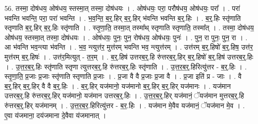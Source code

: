 \documentclass[17pt]{extarticle}
\begin{document}
56. तस्मा॒ दोष॑धय॒ ओष॑धय॒ स्तस्मा॒त् तस्मा॒ दोष॑धयः । . ओष॑धयः॒ परा॒ परौष॑धय॒ ओष॑धयः॒ परा᳚ । . परा॑ भवन्ति भवन्ति॒ परा॒ परा॑ भवन्ति । . भ॒व॒न्ति॒ ब॒र्॒.हिर् ब॒र्॒.हिर् भ॑वन्ति भवन्ति ब॒र्॒.हिः । . ब॒र्॒.हिः स्तृ॑णाति स्तृणाति ब॒र्॒.हिर् ब॒र्॒.हिः स्तृ॑णाति । . स्तृ॒णा॒ति॒ तस्मा॒त् तस्मा᳚थ् स्तृणाति स्तृणाति॒ तस्मा᳚त् । . तस्मा॒ दोष॑धय॒ ओष॑धय॒ स्तस्मा॒त् तस्मा॒ दोष॑धयः । . ओष॑धयः॒ पुनः॒ पुन॒ रोष॑धय॒ ओष॑धयः॒ पुनः॑ । . पुन॒ रा पुनः॒ पुन॒ रा । . आ भ॑वन्ति भव॒न्त्या भ॑वन्ति । . भ॒व॒ न्त्युत्त॑र॒ मुत्त॑रम् भवन्ति भव॒ न्त्युत्त॑रम् । . उत्त॑रम् ब॒र्॒.हिषो॑ ब॒र्॒.हिष॒ उत्त॑र॒ मुत्त॑रम् ब॒र्॒.हिषः॑ । . उत्त॑र॒मित्युत् - त॒र॒म् । . ब॒र्॒.हिष॑ उत्तरब॒र्॒.हि रु॑त्तरब॒र्॒.हिर् ब॒र्॒.हिषो॑ ब॒र्॒.हिष॑ उत्तरब॒र्॒.हिः । . उ॒त्त॒र॒ब॒र्॒.हिः स्तृ॑णाति स्तृणा त्युत्तरब॒र्॒.हि रु॑त्तरब॒र्॒.हिः स्तृ॑णाति । . उ॒त्त॒र॒ब॒र्॒.हिरित्यु॑त्तर - ब॒र्॒.हिः । . स्तृ॒णा॒ति॒ प्र॒जाः प्र॒जाः स्तृ॑णाति स्तृणाति प्र॒जाः । . प्र॒जा वै वै प्र॒जाः प्र॒जा वै । . प्र॒जा इति॑ प्र - जाः । . वै ब॒र्॒.हिर् ब॒र्॒.हिर् वै वै ब॒र्॒.हिः । . ब॒र्॒.हिर् यज॑मानो॒ यज॑मानो ब॒र्॒.हिर् ब॒र्॒.हिर् यज॑मानः । . यज॑मान उत्तरब॒र्॒.हि रु॑त्तरब॒र्॒.हिर् यज॑मानो॒ यज॑मान उत्तरब॒र्॒.हिः । . उ॒त्त॒र॒ब॒र्॒.हिर् यज॑मानं॒ ॅयज॑मान मुत्तरब॒र्॒.हि रु॑त्तरब॒र्॒.हिर् यज॑मानम् । . उ॒त्त॒र॒ब॒र॒.हिरित्यु॑त्तर - ब॒र॒.हिः । . यज॑मान मे॒वैव यज॑मानं॒ ॅयज॑मान मे॒व । . ए॒वा य॑जमाना॒ दय॑जमाना दे॒वैवा य॑जमानात् । \newline
\end{document}
